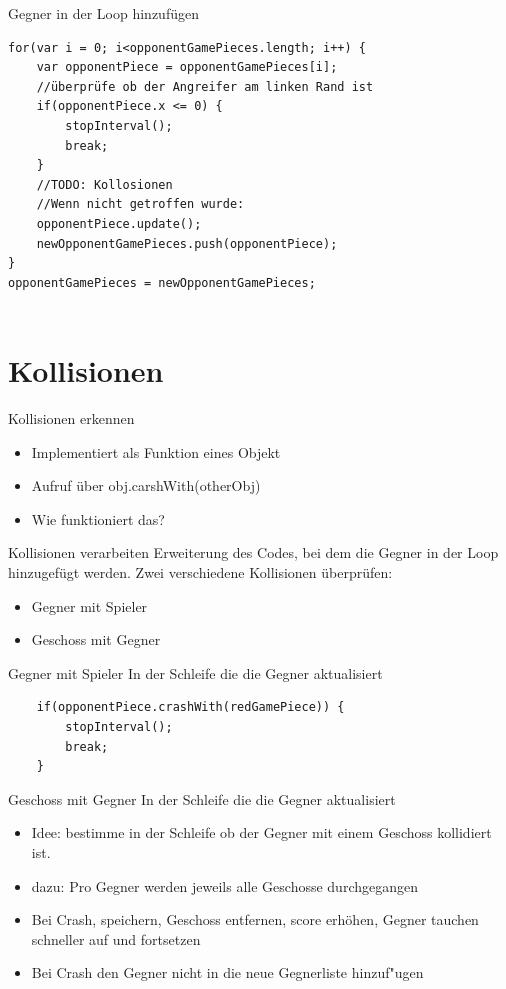 \documentclass[18pt]{beamer}
\begin{document}
\begin{frame}[fragile]{Gegner in der Loop hinzufügen}
\begin{lstlisting}	
for(var i = 0; i<opponentGamePieces.length; i++) {
	var opponentPiece = opponentGamePieces[i];
	//überprüfe ob der Angreifer am linken Rand ist
	if(opponentPiece.x <= 0) {
		stopInterval();
		break;
	}
	//TODO: Kollosionen
	//Wenn nicht getroffen wurde: 
	opponentPiece.update();
	newOpponentGamePieces.push(opponentPiece);
}
opponentGamePieces = newOpponentGamePieces;
	
\end{lstlisting}
\end{frame}

\section{Kollisionen}
\begin{frame}{Kollisionen erkennen}
\begin{itemize}
	\item Implementiert als Funktion eines Objekt
	\item Aufruf über obj.carshWith(otherObj)
	\item Wie funktioniert das?
\end{itemize}

\end{frame}

\begin{frame}{Kollisionen verarbeiten}
Erweiterung des Codes, bei dem die Gegner in der Loop hinzugefügt werden.
Zwei verschiedene Kollisionen überprüfen:
\begin{itemize}
	\item Gegner mit Spieler
	\item Geschoss mit Gegner
\end{itemize}
\end{frame}

\begin{frame}[fragile]{Gegner mit Spieler}
In der Schleife die die Gegner aktualisiert
\begin{lstlisting}
	if(opponentPiece.crashWith(redGamePiece)) {
		stopInterval();
		break;
	}
\end{lstlisting}
\end{frame}

\begin{frame}{Geschoss mit Gegner}
In der Schleife die die Gegner aktualisiert
\begin{itemize}
	\item Idee: bestimme in der Schleife ob der Gegner mit einem Geschoss kollidiert ist.
	\item dazu: Pro Gegner werden jeweils alle Geschosse durchgegangen
	\item Bei Crash, speichern, Geschoss entfernen, score erhöhen, Gegner tauchen schneller auf und fortsetzen
	\item Bei Crash den Gegner nicht in die neue Gegnerliste hinzuf"ugen
\end{itemize}
\end{frame}
\end{document}
